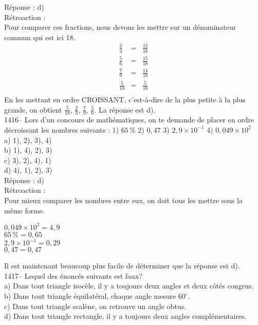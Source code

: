 R\'eponse : d)\\

R\'etroaction :\\
Pour comparer ces fractions, nous devons les mettre sur un
d\'enominateur commun qui est ici 18.
\begin{eqnarray*}
\frac{2}{3}&=&\frac{12}{18}\\[3mm]
\frac{5}{6}&=&\frac{15}{18}\\[3mm]
\frac{7}{9}&=&\frac{14}{18}\\[3mm]
\frac{5}{18}&=&\frac{5}{18}\\[3mm]
\end{eqnarray*}
En les mettant en ordre CROISSANT, c'est-\`a-dire de la plus petite
\`a la plus grande, on
obtient $\frac{5}{18}$,  $\frac{2}{3}$,  $\frac{7}{9}$,  $\frac{5}{6}$. La
r\'eponse est d).\\

1416-- Lors d'un concours de math\'ematiques, on te demande de placer
en ordre d\'ecroissant les nombres suivants : \vskip 10pt 1)
$65\,\%$ \vskip 10pt 2) $0,47$ \vskip 10pt 3) $2,9\times10^{-1}$
\vskip 10pt
4) $0,049\times10^{2}$\\

a) 1), 2), 3), 4) \\
b) 1), 4), 2), 3) \\
c) 3), 2), 4), 1) \\
d) 4), 1), 2), 3) \\

R\'eponse : d)\\

R\'etroaction :\\
Pour mieux comparer les nombres entre eux, on doit tous les mettre
sous la m\^eme forme. \vskip10pt \noindent
\begin{center}
$0,049\times10^{2}=4,9$\\
$65\,\%=0,65$\\
$2,9\times10^{-1}=0,29$\\
$0,47=0,47$\\
\end{center}
Il est maintenant beaucoup plus facile de d\'eterminer que la r\'eponse est
d).\\

1417-- Lequel des \'enonc\'es suivants est faux?\\
a) Dans tout triangle isoc\`ele, il y a toujours deux angles et deux
c\^ot\'es congrus.\\
b) Dans tout triangle \'equilat\'eral, chaque angle mesure $60^\circ$.\\
c) Dans tout triangle scal\`ene, on retrouve un angle obtus.\\
d) Dans tout triangle rectangle, il y a toujours deux angles
compl\'ementaires.\\

